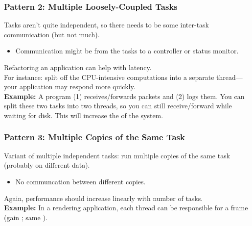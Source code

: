 \documentclass[aspectratio=43]{beamer}
\newenvironment{changemargin}[1]{%
  \begin{list}{}{%
    \setlength{\topsep}{0pt}%
    \setlength{\leftmargin}{#1}%
    \setlength{\rightmargin}{1em}
    \setlength{\listparindent}{\parindent}%
    \setlength{\itemindent}{\parindent}%
    \setlength{\parsep}{\parskip}%
  }%
  \item[]}{\end{list}}
\begin{document}
\begin{frame}
  \frametitle{Pattern 2: Multiple Loosely-Coupled Tasks}

  \begin{changemargin}{2.5cm}
    Tasks aren't quite independent, so there needs to be some inter-task
      communication (but not much).
  \begin{itemize}

    \item Communication might be from the tasks to a controller or status
      monitor.
  \end{itemize}

    Refactoring an application can help with latency. \\
For instance: split off
      the CPU-intensive computations into a separate thread---your application may
      respond more quickly.\\[1em]
     {\bf Example:} A program (1) receives/forwards packets and (2) logs them. You
      can split these two tasks into two threads, so you can still
      receive/forward while waiting for disk. This will increase the
       of the system.
  \end{changemargin}
\end{frame}

\begin{frame}
  \frametitle{Pattern 3: Multiple Copies of the Same Task}

  \begin{changemargin}{2.5cm}
    Variant of multiple independent tasks: run multiple copies of the same task (probably on different data).

  \begin{itemize}
    \item No communcation between different copies.
  \end{itemize}

  Again, performance should increase linearly with number of tasks.\\[1em]

  {\bf Example:} In a rendering application, each thread can be
      responsible for a frame (gain ; same
      ).

  \end{changemargin}
\end{frame}
\end{document}
